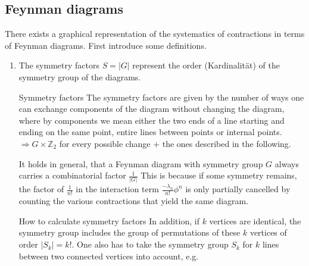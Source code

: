 \subsection{Feynman diagrams}
There exists a graphical representation of the systematics of contractions in terms of Feynman diagrams. First introduce some definitions.
\begin{enumerate}
	\item The symmetry factors $S=|G|$ represent the order (Kardinalität) of the symmetry group of the diagrams.
	\begin{mybox}{Symmetry factors}
		The symmetry factors are given by the number of ways one can exchange components of the diagram without changing the diagram, where by components we mean either the two ends of a line starting and ending on the same point, entire lines between points or internal points.$\Rightarrow G\times \mathbb{Z}_2$ for every possible change $+$ the ones described in the following.
	\end{mybox}
It holds in general, that a Feynman diagram with symmetry group $G$ always carries a combinatorial factor $\frac{1}{|G|}$ This is because if some symmetry remains, the factor of $\frac{1}{n!}$ in the interaction term $\frac{- \lambda_n}{n!}\phi^n$ is only partially cancelled by counting the various contractions that yield the same diagram.
\begin{mybox}{How to calculate symmetry factors}
	In addition, if $k$ vertices are identical, the symmetry group includes the group of permutations of these $k$ vertices of order $|S_k|=k!$. One also has to take the symmetry group $S_k$ for $k$ lines between two connected vertices into account, e.g.
	

\end{mybox}
\end{enumerate}
